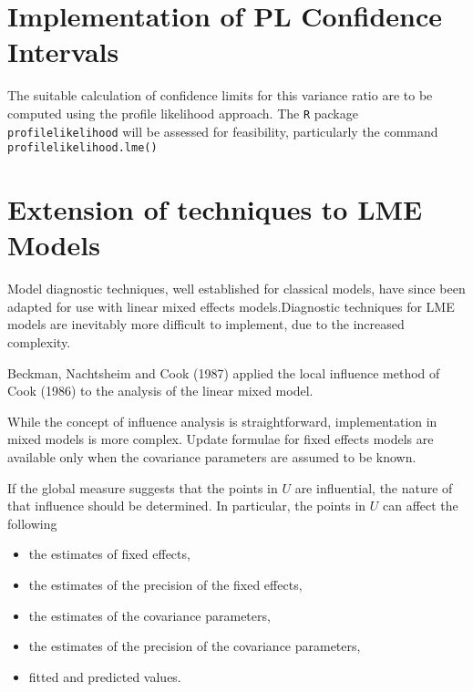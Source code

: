 \documentclass[12pt, a4paper]{report}
\theoremstyle{plain}
\theoremstyle{definition}
\theoremstyle{remark}
\begin{document}
\section{Implementation of PL Confidence Intervals}

The suitable calculation of confidence limits for this variance ratio are to be computed using the profile likelihood approach. The \texttt{R} package \texttt{profilelikelihood} will be assessed for feasibility, particularly the command \texttt{profilelikelihood.lme()}








\newpage
\section{Extension of techniques to LME Models} %

Model diagnostic techniques, well established for classical models, have since been adapted for use with linear mixed effects models.Diagnostic techniques for LME models are inevitably more difficult to implement, due to the increased complexity.

Beckman, Nachtsheim and Cook (1987) \citet{Beckman} applied the local influence method of Cook (1986) to the analysis of the linear mixed model.

While the concept of influence analysis is straightforward, implementation in mixed models is more complex. Update formulae for fixed effects models are available only when the covariance parameters are assumed to be known.

If the global measure suggests that the points in $U$ are influential, the nature of that influence should be determined. In particular, the points in $U$ can affect the following

\begin{itemize}
	\item the estimates of fixed effects,
	\item the estimates of the precision of the fixed effects,
	\item the estimates of the covariance parameters,
	\item the estimates of the precision of the covariance parameters,
	\item fitted and predicted values.
\end{itemize}
\end{document}
